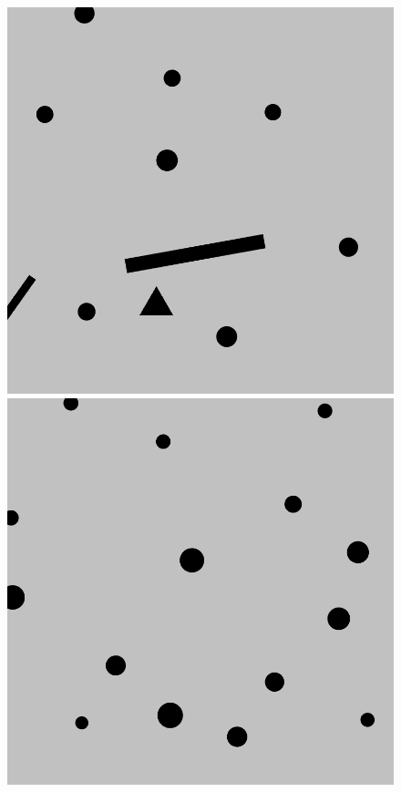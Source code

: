 \documentclass{beamer}
\begin{document}
\begin{frame}
\begin{figure}[H]
\begin{columns}
\begin{column}{0.14\textwidth}
							\includegraphics[width=1\linewidth]{graphics/test_model_11_3.png}
							\includegraphics[width=1\linewidth]{graphics/test_model_15_3.png}
						\end{column}

\end{columns}
\end{figure}
\end{frame}
\end{document}
